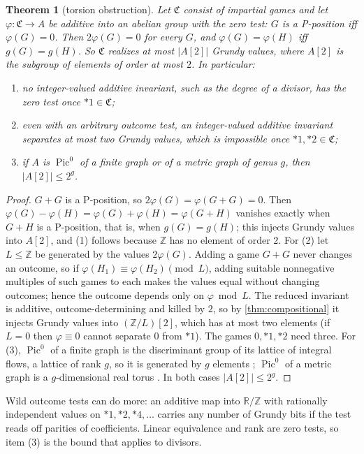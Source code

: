 \documentclass[11pt]{amsart}
\theoremstyle{plain}
\newtheorem{theorem}{Theorem}[section]
\theoremstyle{definition}
\theoremstyle{remark}
\numberwithin{equation}{section}
\newcommand{\ZZ}{\mathbb{Z}}
\newcommand{\RR}{\mathbb{R}}
\begin{document}
\begin{theorem}[torsion obstruction]\label{thm:torsion}
Let $\mathfrak C$ consist of impartial games and let $\varphi\colon\mathfrak C\to A$ be additive into an abelian group with the zero test: $G$ is a P-position iff $\varphi(G)=0$. Then $2\varphi(G)=0$ for every $G$, and $\varphi(G)=\varphi(H)$ iff $g(G)=g(H)$. So $\mathfrak C$ realizes at most $|A[2]|$ Grundy values, where $A[2]$ is the subgroup of elements of order at most $2$. In particular:
\begin{enumerate}[label=\textup{(\arabic*)}]
\item no integer-valued additive invariant, such as the degree of a divisor, has the zero test once $*1\in\mathfrak C$;
\item even with an arbitrary outcome test, an integer-valued additive invariant separates at most two Grundy values, which is impossible once $*1,*2\in\mathfrak C$;
\item if $A$ is $\operatorname{Pic}^0$ of a finite graph or of a metric graph of genus $g$, then $|A[2]|\le 2^g$.
\end{enumerate}
\end{theorem}
\begin{proof}
$G+G$ is a P-position, so $2\varphi(G)=\varphi(G+G)=0$. Then $\varphi(G)-\varphi(H)=\varphi(G)+\varphi(H)=\varphi(G+H)$ vanishes exactly when $G+H$ is a P-position, that is, when $g(G)=g(H)$; this injects Grundy values into $A[2]$, and (1) follows because $\ZZ$ has no element of order $2$.
For (2) let $L\le\ZZ$ be generated by the values $2\varphi(G)$. Adding a game $G+G$ never changes an outcome, so if $\varphi(H_1)\equiv\varphi(H_2)\pmod L$, adding suitable nonnegative multiples of such games to each makes the values equal without changing outcomes; hence the outcome depends only on $\varphi\bmod L$. The reduced invariant is additive, outcome-determining and killed by $2$, so by \cref{thm:compositional} it injects Grundy values into $(\ZZ/L)[2]$, which has at most two elements (if $L=0$ then $\varphi\equiv0$ cannot separate $0$ from $*1$). The games $0,*1,*2$ need three.
For (3), $\operatorname{Pic}^0$ of a finite graph is the discriminant group of its lattice of integral flows, a lattice of rank $g$, so it is generated by $g$ elements \cite{BHN}; $\operatorname{Pic}^0$ of a metric graph is a $g$-dimensional real torus \cite{MikhalkinZharkov}. In both cases $|A[2]|\le 2^g$.
\end{proof}

Wild outcome tests can do more: an additive map into $\RR/\ZZ$ with rationally independent values on $*1,*2,*4,\dots$ carries any number of Grundy bits if the test reads off parities of coefficients. Linear equivalence and rank are zero tests, so item (3) is the bound that applies to divisors.
\end{document}
